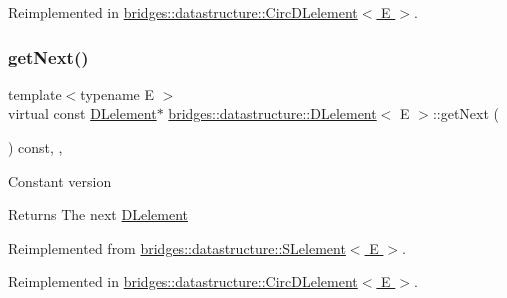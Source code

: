 Reimplemented in \hyperlink{classbridges_1_1datastructure_1_1_circ_d_lelement_a80681d0382643a6df21da1bec4067004}{bridges\+::datastructure\+::\+Circ\+D\+Lelement$<$ E $>$}.

\mbox{\label{classbridges_1_1datastructure_1_1_d_lelement_a8599e5be5fc1771d4e8a40f6de67b4a7}} 
\subsubsection{\texorpdfstring{get\+Next()}{getNext()}\hspace{0.1cm}{\footnotesize\ttfamily [2/2]}}
{\footnotesize\ttfamily template$<$typename E $>$ \\
virtual const \hyperlink{classbridges_1_1datastructure_1_1_d_lelement}{D\+Lelement}$\ast$ \hyperlink{classbridges_1_1datastructure_1_1_d_lelement}{bridges\+::datastructure\+::\+D\+Lelement}$<$ E $>$\+::get\+Next (\begin{DoxyParamCaption}{ }\end{DoxyParamCaption}) const\hspace{0.3cm}{\ttfamily [inline]}, {\ttfamily [override]}, {\ttfamily [virtual]}}

Constant version

\begin{DoxyReturn}{Returns}
The next \hyperlink{classbridges_1_1datastructure_1_1_d_lelement}{D\+Lelement} 
\end{DoxyReturn}


Reimplemented from \hyperlink{classbridges_1_1datastructure_1_1_s_lelement_a8c62cb82fa64bbfe9ebb7334a5fea417}{bridges\+::datastructure\+::\+S\+Lelement$<$ E $>$}.



Reimplemented in \hyperlink{classbridges_1_1datastructure_1_1_circ_d_lelement_a3b54f07ffa49151ed13d8b8df964a4ee}{bridges\+::datastructure\+::\+Circ\+D\+Lelement$<$ E $>$}.

\mbox{\label{classbridges_1_1datastructure_1_1_d_lelement_ac0b2dd38b3e3acee503152c9aa88f61c}} 
